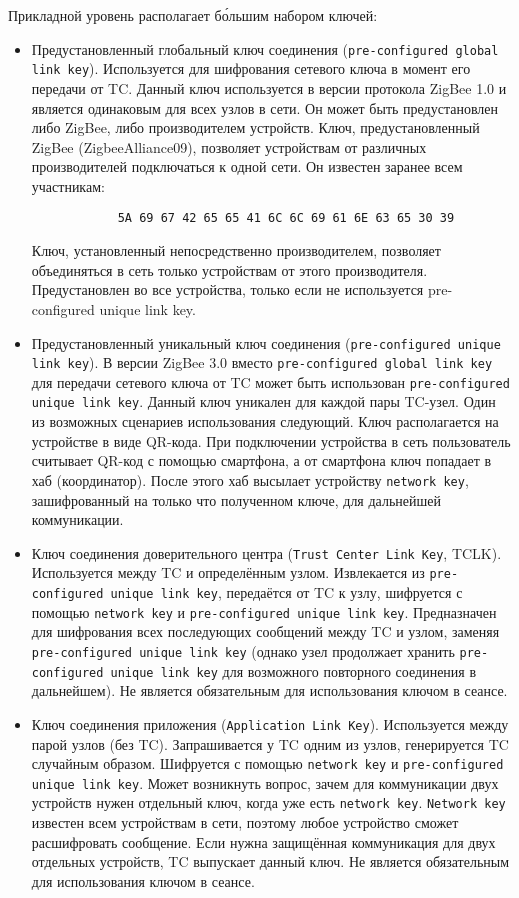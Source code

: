 	Прикладной уровень располагает б\'{о}льшим набором ключей:
	
	\begin{itemize}
		\item Предустановленный глобальный ключ соединения (\texttt{pre-configured global link key}). Используется для 
		шифрования сетевого ключа в момент его передачи от TC. Данный ключ используется в версии протокола
		ZigBee 1.0 и является одинаковым для всех узлов в сети. Он может быть предустановлен либо ZigBee, либо 
		производителем устройств. Ключ, предустановленный ZigBee (ZigbeeAlliance09), позволяет устройствам 
		от различных производителей подключаться к одной сети. Он известен заранее всем участникам:
		\begin{verbatim}
			5A 69 67 42 65 65 41 6C 6C 69 61 6E 63 65 30 39
		\end{verbatim}
		Ключ, установленный непосредственно производителем, позволяет объединяться в сеть только устройствам 
		от этого производителя. Предустановлен во все устройства, только если не используется pre-configured 
		unique link key.
		\item Предустановленный уникальный ключ соединения (\texttt{pre-configured unique link key}). В версии ZigBee 3.0
		вместо \texttt{pre-configured global link key} для передачи сетевого ключа от TC может быть использован 
		\texttt{pre-configured unique link key}. Данный ключ уникален для каждой пары TC-узел. Один из возможных
		сценариев использования следующий. Ключ располагается на устройстве в виде QR-кода. При подключении
		устройства в сеть пользователь считывает QR-код с помощью смартфона, а от смартфона ключ попадает в хаб
		(координатор). После этого хаб высылает устройству \texttt{network key}, зашифрованный на только что полученном
		ключе, для дальнейшей коммуникации.
		\item Ключ соединения доверительного центра (\texttt{Trust Center Link Key}, TCLK). Используется между 
		TC и определённым узлом. Извлекается из \texttt{pre-configured unique link key}, передаётся от TC к узлу, шифруется 
		с помощью \texttt{network key} и \texttt{pre-configured unique link key}. Предназначен для шифрования всех последующих 
		сообщений между TC и узлом, заменяя \texttt{pre-configured unique link key} (однако узел продолжает хранить 
		\texttt{pre-configured unique link key} для возможного повторного соединения в дальнейшем). Не является
		обязательным для использования ключом в сеансе.
		\item Ключ соединения приложения (\texttt{Application Link Key}). Используется между парой узлов (без TC). 
		Запрашивается у TC одним из узлов, генерируется TC случайным образом. Шифруется с помощью 
		\texttt{network key} и \texttt{pre-configured unique link key}. Может возникнуть вопрос, зачем для коммуникации двух
		устройств нужен отдельный ключ, когда уже есть \texttt{network key}. \texttt{Network key} известен всем устройствам 
		в сети, поэтому любое устройство сможет расшифровать сообщение. Если нужна защищённая коммуникация 
		для двух отдельных устройств, TC выпускает данный ключ. Не является обязательным для использования 
		ключом в сеансе.
	\end{itemize}

